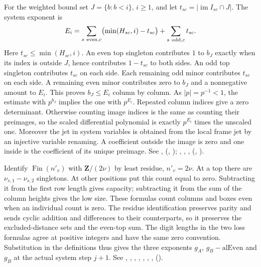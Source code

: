 For the weighted bound set $J=\{b:b<i\}$, $i\ge1$, and let
$t_{sc}=|\operatorname{im}I_{sc}\cap J|$. The system exponent is
\[
 E_i=\sum_{s\ {\rm even},c}\bigl(\min(H_{sc},i)-t_{sc}\bigr)
       +\sum_{s\ {\rm odd},c}t_{sc}.
\]
Here $t_{sc}\le\min(H_{sc},i)$. An even top singleton contributes
$1$ to $b_J$ exactly when its index is outside $J$, hence contributes
$1-t_{sc}$ to both sides. An odd top singleton contributes $t_{sc}$
on each side. Each remaining odd minor contributes $t_{sc}$ on
each side. A remaining even minor contributes zero to $b_J$ and a
nonnegative amount to $E_i$. This proves $b_J\le E_i$ column by
column. As $|p|=p^{-1}<1$, the estimate with $p^{b_J}$ implies the
one with $p^{E_i}$. Repeated column indices give a zero determinant.
Otherwise counting image indices is the same as counting their
preimages, so the scaled differential polynomial is exactly
$p^{E_i}$ times the unscaled one. Moreover the jet in system variables
is obtained from the local frame jet by an injective variable renaming.
A coefficient outside the image is zero and one inside is the
coefficient of its unique preimage.
See , 
(,
);
, , , 
(,
).

Identify $\operatorname{Fin}(n'_v)$ with $\mathbf Z/(2\nu)$ by least
residue, $n'_v=2\nu$. At a top there are
$\nu_{s,1}-\nu_{s,2}$ singletons. At other positions put this count
equal to zero. Subtracting it from the first row length gives capacity;
subtracting it from the sum of the column heights gives the low size.
These formulas count columns and boxes even when an individual count
is zero. The residue identification preserves parity and sends
cyclic addition and differences to their counterparts, so it preserves
the excluded-distance sets and the even-top sum. The digit lengths
in the two loss formulas agree at positive integers and have the same
zero convention. Substitution in the definitions thus gives the three
exponents $g_A$, $g_B-\mathrm{alEven}$ and $g_B$ at the actual
system step $j+1$.
See , , , ,
, , ,
().

